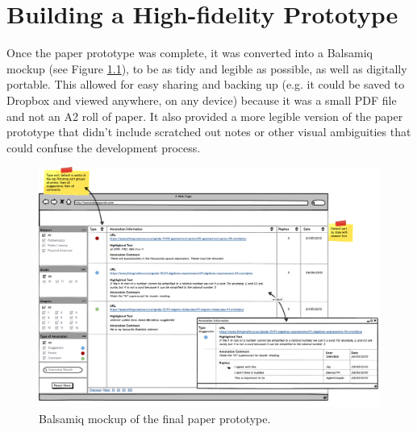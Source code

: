 
\chapter{Building a High-fidelity Prototype} %

\label{Building a High-fidelity Prototype} %



Once the paper prototype was complete, it was converted into a Balsamiq \citep{Balsamiq} mockup (see Figure  \ref{fig:Balsamiq}), to be as tidy and legible as possible, as well as digitally portable. This allowed for easy sharing and backing up (e.g. it could be saved to Dropbox and viewed anywhere, on any device) because it was a small PDF file and not an A2 roll of paper. It also provided a more legible version of the paper prototype that didn't include scratched out notes or other visual ambiguities that could confuse the development process. 

\begin{figure}
    \centering
    \includegraphics[width=\textwidth]{Figures/BalsamiqMockup.png}
 \caption{Balsamiq mockup of the final paper prototype.}
 \label{fig:Balsamiq}
 \end{figure}

